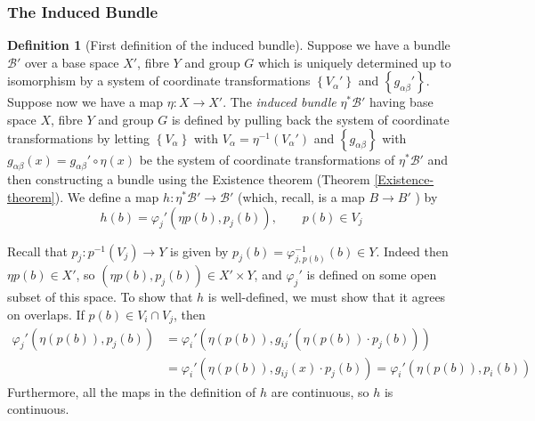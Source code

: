 \documentclass[reqno]{amsart}
\theoremstyle{definition}
\newtheorem{definition}[theorem]{Definition}
\theoremstyle{remark}
\begin{document}
    \subsubsection{The Induced Bundle}

    \begin{definition}[First definition of the induced bundle]
        Suppose we have a bundle
        $\mathcal{B}'$ over a base
        space $X'$, fibre $Y$ and group $G$ which
        is uniquely determined up to isomorphism
        by a system of coordinate transformations
        $\left\{ V_{\alpha}' \right\} $ and
        $\left\{ g_{\alpha \beta}' \right\} $.
        Suppose now we have a map
        $\eta \colon X \to X'$.
        The \textit{induced bundle}
        $\eta^{*}\mathcal{B}'$ having base space
        $X$, fibre $Y$ and group $G$ is defined
        by pulling back the system of coordinate transformations
        by letting $\left\{ V_\alpha \right\} $ with
        $V_{\alpha} = \eta^{-1}\left( V_{\alpha}' \right) $ 
        and
        $\left\{ g_{\alpha \beta} \right\} $ with
        $g_{\alpha \beta}(x)
        = g_{\alpha \beta}' \circ \eta(x)$ be the
        system of coordinate transformations of
        $\eta^{*}\mathcal{B}'$ and then constructing a
        bundle using the Existence theorem
        (Theorem \ref{Existence-theorem}).
        We define a map
        $h \colon
        \eta^{*}\mathcal{B}' \to \mathcal{B}'$ (which,
        recall, is a map $B \to B'$ ) by
        \[
            h(b) =
        \varphi_j' \left( 
        \eta p(b), p_j(b) \right) , \qquad
    p(b) \in V_j
\]

        Recall that
        $p_j \colon
        p^{-1}(V_j) \to Y$ is given by
        $p_j(b) = \varphi_{j,p(b)}^{-1}(b) \in Y$.
        Indeed then
        $\eta p(b) \in X'$, so
        $\left( \eta p(b), p_j(b) \right) \in 
        X' \times Y$, and 
        $\varphi_j'$ is defined on some open
        subset of this space.
        To show that $h$ is well-defined, we
        must show that it agrees on overlaps.
        If $p(b) \in V_i \cap V_j$, then
        \begin{align*}
        \varphi_j'\left( \eta(p(b)), p_j(b) \right) 
        &= \varphi_i' \left( \eta(p(b)),
        g_{ij}' \left( \eta\left( p(b) \right)
    \cdot p_j(b) \right) \right) \\
        &= \varphi_i' \left( \eta (p(b)),
        g_{ij}(x) \cdot p_j(b) \right) 
        = \varphi_i' \left( \eta (p(b)),
        p_i(b) \right) 
        \end{align*}
        Furthermore, all the maps in the definition
        of $h$ are continuous, so $h$ is continuous.\\


\end{definition}
\end{document}
